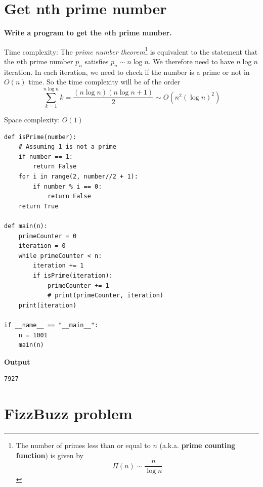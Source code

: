 \documentclass[a4paper,11pt]{book}
\begin{document}
\newpage
\section{Get nth prime number}

\textbf{Write a program to get the $n$th prime number.}
\vspace{5mm}

\noindent Time complexity: The \textit{prime number theorem}\footnote{The number of primes less than or equal to $n$ (a.k.a. \textbf{prime counting function}) is given by $$\Pi(n) \sim \dfrac{n}{\log n}$$} is equivalent to the statement that the $n$th prime number $p_n$ satisfies $p_n \sim n\log n$.  We therefore need to have $n\log n$ iteration. In each iteration, we need to check if the number is a prime or not in $O(n)$ time. So the time complexity will be of the order
$$\sum_{k=1}^{n\log n} k = \dfrac{(n\log n)(n\log n + 1)}{2} \sim O(n^2(\log n)^2)$$

\noindent Space complexity: $O(1)$

\begin{lstlisting}
def isPrime(number):
    # Assuming 1 is not a prime
    if number == 1:
        return False
    for i in range(2, number//2 + 1):
        if number % i == 0:
            return False
    return True

def main(n):
    primeCounter = 0
    iteration = 0
    while primeCounter < n:
        iteration += 1
        if isPrime(iteration):
            primeCounter += 1
            # print(primeCounter, iteration)
    print(iteration)

if __name__ == "__main__":
    n = 1001
    main(n)
\end{lstlisting}
\textbf{Output}
\begin{lstlisting}
7927
\end{lstlisting}

\newpage
\section{FizzBuzz problem}
\end{document}
